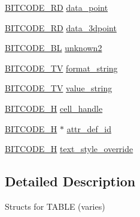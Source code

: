 \begin{DoxyCompactItemize}
\hyperlink{dwg_8h_a1d23a9bc9a02453876b244dc6706f6a6}{\-B\-I\-T\-C\-O\-D\-E\-\_\-R\-D} \hyperlink{struct__dwg__entity__TABLE__cell_a806581ed94257d5a1c4058c88172ec3e}{data\-\_\-point}
\item 
\hyperlink{dwg_8h_a96f3251650755bdaae4d774cc36a06c0}{\-B\-I\-T\-C\-O\-D\-E\-\_\-R\-D} \hyperlink{struct__dwg__entity__TABLE__cell_a1abf2c6d31b69318952a82fc34d6caa6}{data\-\_\-3dpoint}
\item 
\hyperlink{dwg_8h_aebd5f127038868cbabc3d55d91da776c}{\-B\-I\-T\-C\-O\-D\-E\-\_\-\-B\-L} \hyperlink{struct__dwg__entity__TABLE__cell_a6f22a4bf1b3552a484250e780fdcfe6e}{unknown2}
\item 
\hyperlink{dwg_8h_a2a7e040c6e36ca039b03608679ecaf7c}{\-B\-I\-T\-C\-O\-D\-E\-\_\-\-T\-V} \hyperlink{struct__dwg__entity__TABLE__cell_a97d446fc8984851d56a881073407062f}{format\-\_\-string}
\item 
\hyperlink{dwg_8h_a2a7e040c6e36ca039b03608679ecaf7c}{\-B\-I\-T\-C\-O\-D\-E\-\_\-\-T\-V} \hyperlink{struct__dwg__entity__TABLE__cell_a82950597a4dbbe6fb41e0d517383a4cd}{value\-\_\-string}
\item 
\hyperlink{dwg_8h_a7c700e94e047a97ba8c24bdfe4029dc3}{\-B\-I\-T\-C\-O\-D\-E\-\_\-\-H} \hyperlink{struct__dwg__entity__TABLE__cell_a91aa4dc82bbb643ed7bfe7655e4aa695}{cell\-\_\-handle}
\item 
\hyperlink{dwg_8h_a7c700e94e047a97ba8c24bdfe4029dc3}{\-B\-I\-T\-C\-O\-D\-E\-\_\-\-H} $\ast$ \hyperlink{struct__dwg__entity__TABLE__cell_a7cda9cbd8fbc47afe0e2406fe7bd296e}{attr\-\_\-def\-\_\-id}
\item 
\hyperlink{dwg_8h_a7c700e94e047a97ba8c24bdfe4029dc3}{\-B\-I\-T\-C\-O\-D\-E\-\_\-\-H} \hyperlink{struct__dwg__entity__TABLE__cell_ab2903e1f783b580952c3043a3dbadc80}{text\-\_\-style\-\_\-override}
\end{DoxyCompactItemize}


\subsection{\-Detailed \-Description}
\-Structs for \-T\-A\-B\-L\-E (varies) 

